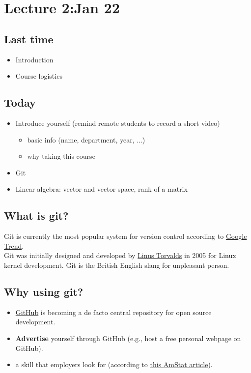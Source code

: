\setcounter{section}{1}

\section{Lecture 2:Jan 22}

\subsection*{Last time}
\begin{itemize}
\item Introduction
\item Course logistics
\end{itemize}

\subsection*{Today}
\begin{itemize}
\item Introduce yourself (remind remote students to record a short video)
  \begin{itemize}
    \item basic info (name, department, year, ...)
    \item why taking this course
  \end{itemize}
\item Git
\item Linear algebra: vector and vector space, rank of a matrix
\end{itemize}

\subsection*{What is git?}
Git is currently the most popular system for version control according to \href{https://trends.google.com/trends/explore?date=all&q=\%2Fm\%2F05vqwg,\%2Fm\%2F012ct9,\%2Fm\%2F08441_,\%2Fm\%2F08w6d6,\%2Fm\%2F09d6g&hl=en-US&tz=&tz=}{Google Trend}.\\
Git was initially designed and developed by \href{http://en.wikipedia.org/wiki/Linus_Torvalds}{Linus Torvalds} in 2005 for Linux kernel development.  Git is the British English slang for unpleasant person.

\subsection*{Why using git?}
\begin{itemize}
  \item \href{https://github.com/}{GitHub} is becoming a de facto central repository for open source development. 
  \item {\bf Advertise} yourself through GitHub (e.g., host a free personal webpage on GitHub).
  \item a skill that employers look for (according to \href{http://magazine.amstat.org/blog/2018/01/01/data-science-mooc/}{this AmStat article}).
\end{itemize}

